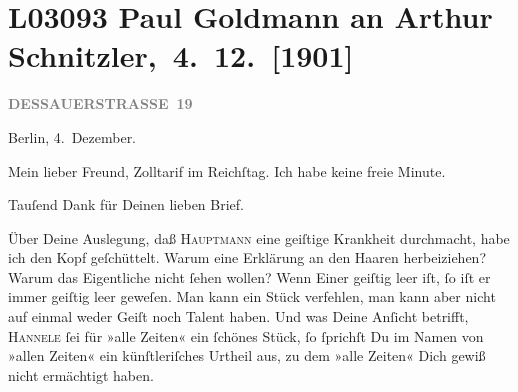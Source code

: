 

\section[ Paul Goldmann an Arthur Schnitzler, 4. 12. {[}1901{]}]{L03093 Paul Goldmann an Arthur Schnitzler, 4. 12. {[}1901{]}}
\nopagebreak{}
\rehead{ }\normalsize\beginnumbering{}
\toendnotes[C]{\smallbreak\pagebreak[2]}
\toendnotes[C]{\smallbreak}
\pstart
           \raggedleft{}{\pb}\textcolor{gray}{\textbf{DESSAUERSTRASSE 19}}\pend
           
\pstart
           Berlin, 4. Dezember.\pend
           
\pstart\center{}Mein lieber Freund,\pend\vspace{0.5em}
\pstart
           Zolltarif im Reichſtag. Ich habe keine freie
               Minute.\pend
           
\pstart
           Tauſend Dank für Deinen lieben Brief.\pend
           
\pstart
           Über Deine Auslegung, daß \textsc{Hauptmann} eine geiſtige Krankheit durchmacht, habe ich den Kopf geſchüttelt. Warum eine
               Erklärung {\pb}an den Haaren herbeiziehen? Warum das
               Eigentliche nicht ſehen wollen? Wenn Einer geiſtig leer iſt, ſo iſt er immer geiſtig
               leer geweſen. Man kann ein Stück verfehlen, man kann aber nicht auf einmal weder
               Geiſt noch Talent haben. Und was Deine Anſicht betrifft, \textsc{Hannele} ſei für »alle Zeiten« ein ſchönes Stück, ſo ſprichſt Du im Namen von »allen
               Zeiten« ein künſtleriſches Urtheil aus, zu dem »alle Zeiten« Dich gewiß {\pb}nicht ermächtigt haben.\pend
           
